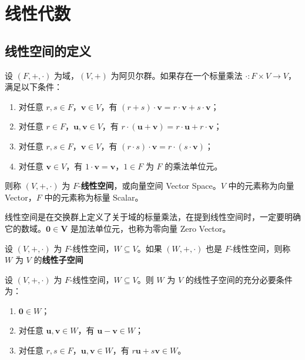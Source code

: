 \chapter{线性代数}

\section{线性空间的定义}

\begin{definition}
    设 $ (F,+,\cdot) $ 为域，$ (V,+) $ 为阿贝尔群。如果存在一个标量乘法 $ \cdot: F\times V \to V $，满足以下条件：
    \begin{enumerate}
        \item 对任意 $ r,s\in F $，$ \mathbf{v}\in V $，有 $ (r+s)\cdot \mathbf{v} = r\cdot \mathbf{v} + s\cdot \mathbf{v} $；
        \item 对任意 $ r\in F $，$ \mathbf{u},\mathbf{v}\in V $，有 $ r\cdot (\mathbf{u}+\mathbf{v}) = r\cdot \mathbf{u} + r\cdot \mathbf{v} $；
        \item 对任意 $ r,s\in F $，$ \mathbf{v}\in V $，有 $ (r\cdot s)\cdot \mathbf{v} = r\cdot (s\cdot \mathbf{v}) $；
        \item 对任意 $ \mathbf{v}\in V $，有 $ 1\cdot \mathbf{v} = \mathbf{v} $，$1\in F$ 为 $ F $ 的乘法单位元。
    \end{enumerate}
    则称 $ (V,+,\cdot) $ 为 $ F $-\textbf{线性空间}，或向量空间 Vector Space。$V$ 中的元素称为向量 Vector，$F$ 中的元素称为标量 Scalar。
    \label{def:linear_space}
\end{definition}

\begin{note}
    线性空间是在交换群上定义了关于域的标量乘法，在提到线性空间时，一定要明确它的数域。$\mathbf{0}\in \mathbf{V}$ 是加法单位元，也称为零向量 Zero Vector。
\end{note}

\begin{definition}
    设 $ (V,+,\cdot) $ 为 $ F $-线性空间，$ W \subseteq V $。如果 $ (W,+,\cdot) $ 也是 $ F $-线性空间，则称 $ W $ 为 $ V $ 的\textbf{线性子空间}
    \label{def:linear_subspace}
\end{definition}

\begin{theorem}[线性子空间判定定理]
    设 $ (V,+,\cdot) $ 为 $ F $-线性空间，$ W \subseteq V $。则 $ W $ 为 $ V $ 的线性子空间的充分必要条件为：
    \begin{enumerate}
        \item $ \mathbf{0}\in W $；
        \item 对任意 $ \mathbf{u},\mathbf{v}\in W $，有 $ \mathbf{u}-\mathbf{v}\in W $；
        \item 对任意 $ r,s\in F $，$ \mathbf{u},\mathbf{v}\in W $，有 $ r \mathbf{u}+s \mathbf{v}\in W $。
    \end{enumerate}
    \label{thm:linear_subspace_judge}
\end{theorem}


